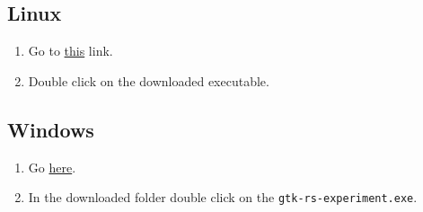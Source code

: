\documentclass[12pt, a4]{article}
\begin{document}
\subsection{Linux}

\begin{enumerate}
  \item{Go to \href{https://downgit.github.io/#/home?url=https://github.com/ArchitBhonsle/gtk-rs-experiment/blob/main/linux-executable}{this}
        link.}
  \item{Double click on the downloaded executable.}
\end{enumerate}

\subsection{Windows}

\begin{enumerate}
  \item{Go
        \href {https://downgit.github.io/#/home?url=https://github.com/ArchitBhonsle/gtk-rs-experiment/tree/main/windows-package}
        {here}.}
  \item{In the downloaded folder double click on the
        \texttt{gtk-rs-experiment.exe}.}
\end{enumerate}
\end{document}
